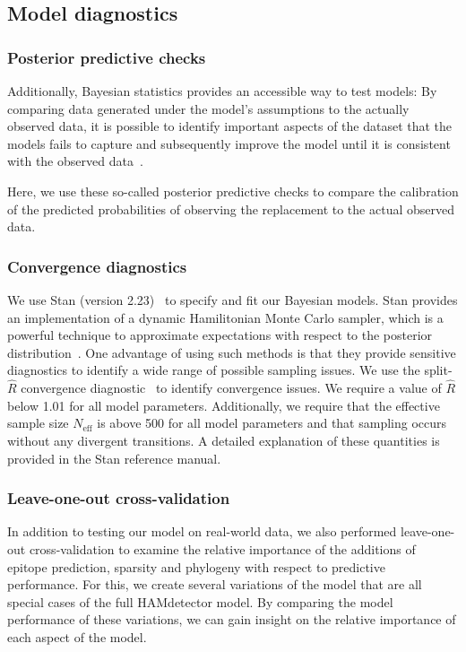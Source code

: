 \documentclass{bioinfo}
\begin{document}
\begin{methods}
  \subsection{Model diagnostics}

  \subsubsection{Posterior predictive checks}

  Additionally, Bayesian statistics provides an accessible way to test models: By comparing data generated under the model's assumptions to the actually observed data, it is possible to identify important aspects of the dataset that the models fails to capture and subsequently improve the model until it is consistent with the observed data~\cite{Gabry2019}.

  Here, we use these so-called posterior predictive checks to compare the calibration of the predicted probabilities of observing the replacement to the actual observed data. 

  \subsubsection{Convergence diagnostics}

  We use Stan (version 2.23)~\cite{Stan2021} to specify and fit our Bayesian models.
  Stan provides an implementation of a dynamic Hamilitonian Monte Carlo sampler, which is a powerful technique to approximate expectations with respect to the posterior distribution~\cite{Betancourt2017}. One advantage of using such methods is that they provide sensitive diagnostics to identify a wide range of possible sampling issues.
  We use the split-\(\hat{R}\) convergence diagnostic~\cite{Gelman1992} to identify convergence issues. We require a value of \(\hat{R}\) below 1.01 for all model parameters. Additionally, we require that the effective sample size \(N_{\text{eff}}\) is above 500 for all model parameters and that sampling occurs without any divergent transitions. A detailed explanation of these quantities is provided in the Stan reference manual.

  \subsubsection{Leave-one-out cross-validation}

  In addition to testing our model on real-world data, we also performed leave-one-out cross-validation to examine the relative importance of the additions of epitope prediction, sparsity and phylogeny with respect to predictive performance.
  For this, we create several variations of the model that are all special cases of the full HAMdetector model.
  By comparing the model performance of these variations, we can gain insight on the relative importance of each aspect of the model.
  

\end{methods}
\end{document}
